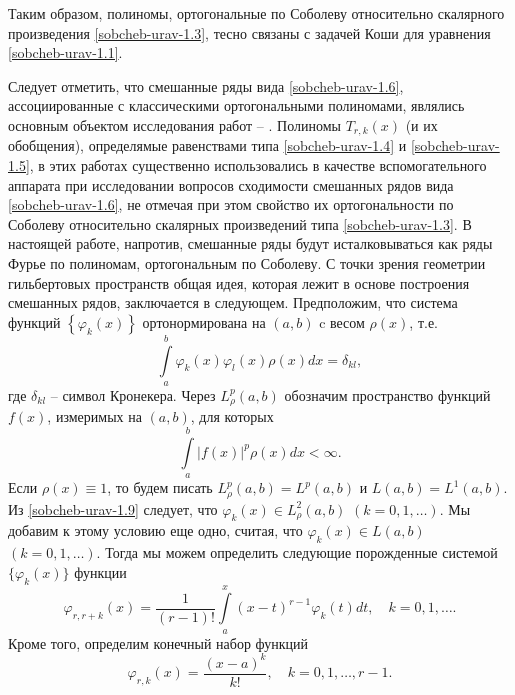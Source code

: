 Таким образом, полиномы, ортогональные по Соболеву относительно скалярного произведения \eqref{sobcheb-urav-1.3}, тесно связаны с задачей Коши для уравнения \eqref{sobcheb-urav-1.1}.

         Следует отметить, что смешанные ряды вида \eqref{sobcheb-urav-1.6}, ассоциированные с классическими ортогональными полиномами, являлись основным объектом исследования работ  \cite{sobcheb_urav-Shar11} -- \cite{sobcheb_urav-Shar18}.
Полиномы $T_{r,k}(x)$ (и их обобщения), определямые равенствами типа \eqref{sobcheb-urav-1.4} и \eqref{sobcheb-urav-1.5}, в этих работах существенно использовались в качестве вспомогательного аппарата при исследовании вопросов сходимости смешанных рядов вида \eqref{sobcheb-urav-1.6},  не отмечая при  этом свойство их ортогональности по Соболеву относительно скалярных произведений типа \eqref{sobcheb-urav-1.3}. В настоящей работе, напротив, смешанные ряды будут исталковываться как ряды Фурье по полиномам, ортогональным по Соболеву. С точки зрения геометрии гильбертовых пространств общая идея, которая лежит в основе построения смешанных рядов, заключается в следующем. Предположим, что система функций  $\left\{\varphi_k(x)\right\}$ ортонормирована  на $(a,b)$  c весом   $\rho(x)$, т.е.
 \begin{equation}\label{sobcheb-urav-1.9}
\int\limits_a^b\varphi_k(x)\varphi_l(x)\rho(x)dx=\delta_{kl},
\end{equation}
где $\delta_{kl}$ -- символ Кронекера. Через $L^p_\rho(a,b)$ обозначим пространство  функций $f(x)$, измеримых  на  $(a,b)$, для которых
 \begin{equation*}
\int\limits_a^b|f(x)|^p\rho(x)dx<\infty.
\end{equation*}
Если $\rho(x)\equiv1$, то будем писать $L^p_\rho(a,b)=L^p(a,b)$ и $L(a,b)=L^1(a,b)$.
Из \eqref{sobcheb-urav-1.9} следует, что $\varphi_k(x)\in L^2_\rho(a,b)$ $(k=0,1,\ldots)$. Мы добавим к этому условию еще одно, считая, что $\varphi_k(x)\in L(a,b)$ $(k=0,1,\ldots)$. Тогда мы можем определить следующие порожденные системой $\{\varphi_k(x)\}$ функции
 \begin{equation}\label{sobcheb-urav-1.10}
\varphi_{r,r+k}(x) =\frac{1}{(r-1)!}\int\limits_a^x(x-t)^{r-1}\varphi_{k}(t)dt, \quad k=0,1,\ldots.
\end{equation}
 Кроме того, определим конечный набор функций
  \begin{equation}\label{sobcheb-urav-1.11}
\varphi_{r,k}(x) =\frac{(x-a)^k}{k!}, \quad k=0,1,\ldots, r-1.
\end{equation}

